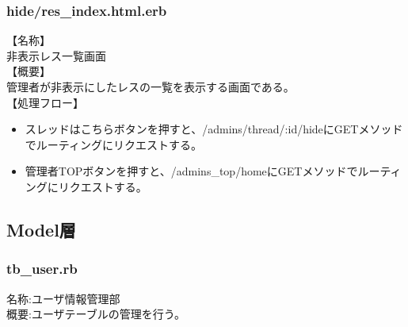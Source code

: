 \documentclass[a4j]{jarticle}
\begin{document}
\subsubsection{hide/res\_index.html.erb}
\noindent
【名称】\\
非表示レス一覧画面\\
【概要】\\
管理者が非表示にしたレスの一覧を表示する画面である。\\
【処理フロー】
\begin{itemize}
  \item スレッドはこちらボタンを押すと、/admins/thread/:id/hideにGETメソッドでルーティングにリクエストする。
  \item 管理者TOPボタンを押すと、/admins\_top/homeにGETメソッドでルーティングにリクエストする。
\end{itemize}

%

\subsection{Model層}

\subsubsection{tb\_user.rb}
  \noindent
  名称:ユーザ情報管理部\\
  概要:ユーザテーブルの管理を行う。\\
\end{document}
